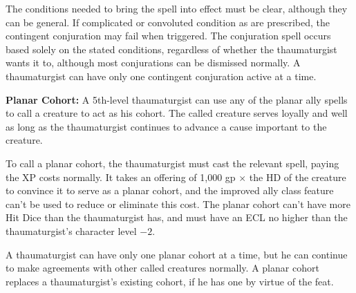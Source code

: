 {The conditions needed to bring the spell into effect must be clear, although they can be general. If complicated or convoluted condition as are prescribed, the contingent conjuration may fail when triggered. The conjuration spell occurs based solely on the stated conditions, regardless of whether the thaumaturgist wants it to, although most conjurations can be dismissed normally. A thaumaturgist can have only one contingent conjuration active at a time.

\textbf{Planar Cohort:} A 5th-level thaumaturgist can use any of the planar ally spells to call a creature to act as his cohort. The called creature serves loyally and well as long as the thaumaturgist continues to advance a cause important to the creature.

To call a planar cohort, the thaumaturgist must cast the relevant spell, paying the XP costs normally. It takes an offering of 1,000 gp $\times$ the HD of the creature to convince it to serve as a planar cohort, and the improved ally class feature can't be used to reduce or eliminate this cost. The planar cohort can't have more Hit Dice than the thaumaturgist has, and must have an ECL no higher than the thaumaturgist's character level $-2$.

A thaumaturgist can have only one planar cohort at a time, but he can continue to make agreements with other called creatures normally. A planar cohort replaces a thaumaturgist's existing cohort, if he has one by virtue of the  feat.
}